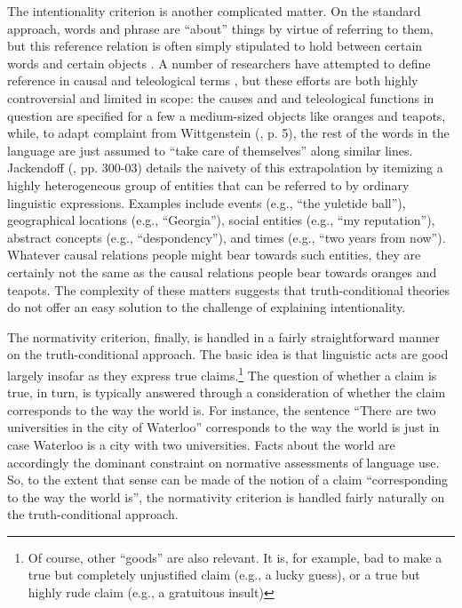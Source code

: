 The intentionality criterion is another complicated matter. On the standard approach, words and phrase are ``about'' things by virtue of referring to them, but this reference relation is often simply stipulated to hold between certain words and certain objects \citep{Stanley:2008}. A number of researchers have attempted to define reference in causal and teleological terms \citep{Speaks:2014,Dennett:1987,Millikan:1989}, but these efforts are both highly controversial \citep{Horwich:2005} and limited in scope: the causes and and teleological functions in question are specified for a few a medium-sized objects like oranges and teapots, while, to adapt complaint from Wittgenstein (\citeyear{Wittgenstein:1953}, p. 5), the rest of the words in the language are just assumed to ``take care of themselves'' along similar lines. Jackendoff (\citeyear{Jackendoff:2002}, pp. 300-03) details the naivety of this extrapolation by itemizing a highly heterogeneous group of entities that can be referred to by ordinary linguistic expressions. Examples include events (e.g., ``the yuletide ball''), geographical locations (e.g., ``Georgia''), social entities (e.g., ``my reputation''), abstract concepts (e.g., ``despondency''), and times (e.g., ``two years from now''). Whatever causal relations people might bear towards such entities, they are certainly not the same as the causal relations people bear towards oranges and teapots. The complexity of these matters suggests that truth-conditional theories do not offer an easy solution to the challenge of explaining intentionality.

The normativity criterion, finally, is handled in a fairly straightforward manner on the truth-conditional approach. The basic idea is that linguistic acts are good largely insofar as they express true claims.\footnote{Of course, other ``goods'' are also relevant. It is, for example, bad to make a true but completely unjustified claim (e.g., a lucky guess), or a true but highly rude claim (e.g., a gratuitous insult)} The question of whether a claim is true, in turn, is typically answered through a consideration of whether the claim corresponds to the way the world is. For instance, the sentence ``There are two universities in the city of Waterloo'' corresponds to the way the world is just in case Waterloo is a city with two universities. Facts about the world are accordingly the dominant constraint on normative assessments of language use. So, to the extent that sense can be made of the notion of a claim ``corresponding to the way the world is'', the normativity criterion is handled fairly naturally on the truth-conditional approach.

